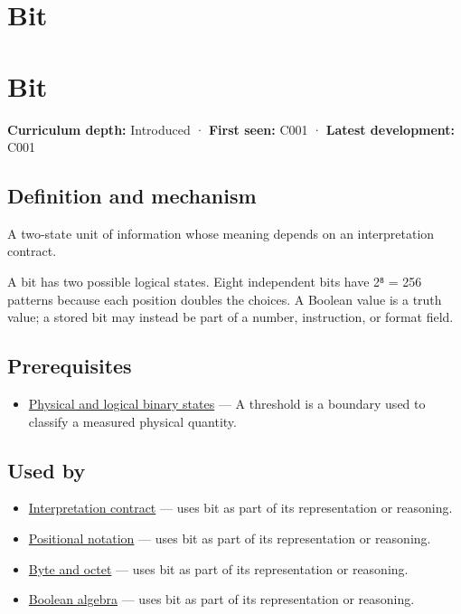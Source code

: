 \hypertarget{appendix-ddbb69998a2e}{}
\section*{Bit}
\section{Bit}\label{bit}

\textbf{Curriculum depth:} Introduced · \textbf{First seen:} C001 · \textbf{Latest development:} C001

\subsection{Definition and mechanism}\label{definition-and-mechanism}

A two-state unit of information whose meaning depends on an interpretation contract.

A bit has two possible logical states. Eight independent bits have 2⁸ = 256 patterns because each position doubles the choices. A Boolean value is a truth value; a stored bit may instead be part of a number, instruction, or format field.

\subsection{Prerequisites}\label{prerequisites}

\begin{itemize}
\tightlist
\item
  \hyperref[appendix-ea798b1ceb35]{Physical and logical binary states} --- A threshold is a boundary used to classify a measured physical quantity.
\end{itemize}

\subsection{Used by}\label{used-by}

\begin{itemize}
\tightlist
\item
  \hyperref[appendix-f414bd4ed05c]{Interpretation contract} --- uses bit as part of its representation or reasoning.
\item
  \hyperref[appendix-83c3f28f7bda]{Positional notation} --- uses bit as part of its representation or reasoning.
\item
  \hyperref[appendix-5bee2df85484]{Byte and octet} --- uses bit as part of its representation or reasoning.
\item
  \hyperref[appendix-24475e1596a8]{Boolean algebra} --- uses bit as part of its representation or reasoning.
\end{itemize}

